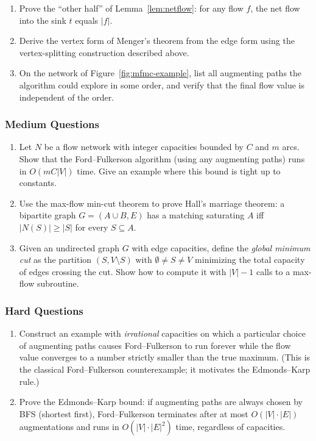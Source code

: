 \documentclass{article}
\theoremstyle{definition}
\begin{document}
\begin{enumerate}
\item Prove the ``other half'' of Lemma~\ref{lem:netflow}: for any flow
$f$, the net flow into the sink $t$ equals $|f|$.

\item Derive the vertex form of Menger's theorem from the edge form using
the vertex-splitting construction described above.

\item On the network of Figure~\ref{fig:mfmc-example}, list all augmenting
paths the algorithm could explore in some order, and verify that the
final flow value is independent of the order.
\end{enumerate}

\subsubsection{Medium Questions}

\begin{enumerate}[resume]
\item Let $N$ be a flow network with integer capacities bounded by $C$ and
$m$ arcs. Show that the Ford--Fulkerson algorithm (using any
augmenting paths) runs in $O(m C |V|)$ time. Give an example where
this bound is tight up to constants.

\item Use the max-flow min-cut theorem to prove Hall's marriage theorem:
a bipartite graph $G = (A \cup B, E)$ has a matching saturating $A$
iff $|N(S)| \ge |S|$ for every $S \subseteq A$.

\item Given an undirected graph $G$ with edge capacities, define the
\emph{global minimum cut} as the partition $(S, V \setminus S)$ with
$\emptyset \ne S \ne V$ minimizing the total capacity of edges
crossing the cut. Show how to compute it with $|V| - 1$ calls to a
max-flow subroutine.
\end{enumerate}

\subsubsection{Hard Questions}

\begin{enumerate}[resume]
\item Construct an example with \emph{irrational} capacities on which a
particular choice of augmenting paths causes Ford--Fulkerson to
run forever while the flow value converges to a number strictly
smaller than the true maximum. (This is the classical Ford--Fulkerson
counterexample; it motivates the Edmonds--Karp rule.)

\item Prove the Edmonds--Karp bound: if augmenting paths are always chosen
by BFS (shortest first), Ford--Fulkerson terminates after at most
$O(|V| \cdot |E|)$ augmentations and runs in $O(|V| \cdot |E|^2)$
time, regardless of capacities.
\end{enumerate}
\end{document}
